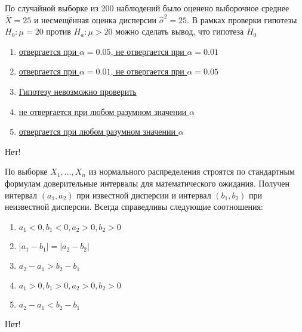 \documentclass[t]{beamer}
\begin{document}
 \begin{frame} \label{15-No} 
\begin{block}{15} 

  По случайной выборке из 200 наблюдений было оценено выборочное среднее $\bar{X} = 25$  и несмещённая оценка дисперсии $\hat{\sigma}^2 = 25$. В рамках проверки гипотезы $H_0: \mu = 20$ против $H_a: \mu > 20$ можно сделать вывод, что гипотеза $H_0$
  


 \end{block} 
\begin{enumerate} 
\item[] \hyperlink{15-No}{\beamergotobutton{} отвергается при $\alpha = 0.05$, не отвергается при $\alpha = 0.01$}
\item[] \hyperlink{15-No}{\beamergotobutton{} отвергается при $\alpha = 0.01$, не отвергается при $\alpha = 0.05$}
\item[] \hyperlink{15-No}{\beamergotobutton{} Гипотезу невозможно проверить}
\item[] \hyperlink{15-No}{\beamergotobutton{} не отвергается при любом разумном значении $\alpha$}
\item[] \hyperlink{15-Yes}{\beamergotobutton{} отвергается при любом разумном значении $\alpha$}
\end{enumerate} 

 \alert{Нет!} 
\end{frame} 


 \begin{frame} \label{16-No} 
\begin{block}{16} 

   По выборке $X_1,\ldots, X_n$ из нормального распределения строятся по стандартным формулам доверительные интервалы для математического ожидания. Получен интервал $(a_1,a_2)$ при известной дисперсии и интервал $(b_1,b_2)$ при неизвестной дисперсии. Всегда справедливы следующие соотношения:
  


 \end{block} 
\begin{enumerate} 
\item[] \hyperlink{16-No}{\beamergotobutton{} $a_1<0,b_1<0,a_2>0,b_2>0$}
\item[] \hyperlink{16-Yes}{\beamergotobutton{} $|a_1-b_1| = |a_2-b_2|$}
\item[] \hyperlink{16-No}{\beamergotobutton{} $a_2 - a_1 > b_2 - b_1$}
\item[] \hyperlink{16-No}{\beamergotobutton{} $a_1>0,b_1>0,a_2>0,b_2>0$}
\item[] \hyperlink{16-No}{\beamergotobutton{} $a_2 - a_1 < b_2 - b_1$}
\end{enumerate} 

 \alert{Нет!} 
\end{frame} 
\end{document}
